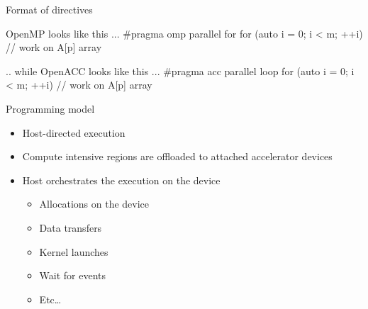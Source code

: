 \documentclass[12pt,aspectratio=169]{beamer}
\begin{document}
\begin{frame}[fragile]{Format of directives}
  \begin{Cpplisting}{OpenMP looks like this ...}
    #pragma omp parallel for
    for (auto i = 0; i < m; ++i) {
        // work on A[p] array
    }
  \end{Cpplisting}
  \begin{Cpplisting}{.. while OpenACC looks like this ...}
    #pragma acc parallel loop
    for (auto i = 0; i < m; ++i) {
        // work on A[p] array
    }
  \end{Cpplisting}
\end{frame}

\begin{frame}{Programming model}
  \begin{itemize}
  \item Host-directed execution
  \item Compute intensive regions are offloaded to attached accelerator devices
  \item Host orchestrates the execution on the device
    \begin{itemize}
    \item Allocations on the device
    \item Data transfers
    \item Kernel launches
    \item Wait for events
    \item Etc\dots
    \end{itemize}
  \end{itemize}
\end{frame}
\end{document}
